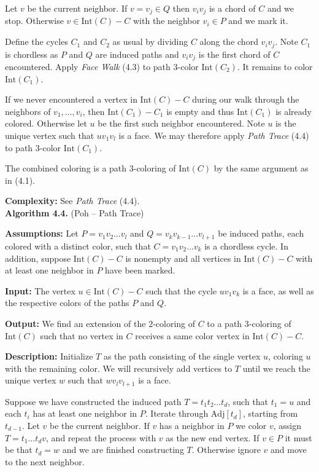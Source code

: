 \documentclass[letterpaper, 12pt]{article}
\theoremstyle{definition}
\theoremstyle{definition}
\theoremstyle{thm}
\theoremstyle{definition}
\begin{document}
Let $v$ be the current neighbor. If $v=v_j\in Q$ then $v_iv_j$ is a chord of $C$
and we stop. Otherwise $v\in \text{Int}(C)-C$ with the neighbor $v_i\in P$ and we
mark it.

Define the cycles $C_1$ and $C_2$ as usual by dividing $C$ along the chord
$v_iv_j$. Note $C_1$ is chordless as $P$ and $Q$ are induced paths
and $v_iv_j$ is the first chord of $C$ encountered. Apply \textit{Face Walk}
(4.3) to path $3$-color $\text{Int}(C_2)$. It remains to color
$\text{Int}(C_1)$.

If we never encountered a vertex in $\text{Int}(C)-C$ during our walk through
the neighbors of $v_1,\ldots,v_i$, then $\text{Int}(C_1)-C_1$ is empty and thus
$\text{Int}(C_1)$ is already colored. Otherwise let $u$ be the first such
neighbor encountered. Note $u$ is the unique vertex
such that $uv_1v_l$ is a face. We may therefore apply \textit{Path Trace} (4.4)
to path $3$-color $\text{Int}(C_1)$.

The combined coloring is a path $3$-coloring of $\text{Int}(C)$ by the
same argument as in (4.1).

\noindent\textbf{Complexity:} See \textit{Path Trace} (4.4).\\

\noindent\textbf{Algorithm 4.4.} (Poh -- Path Trace)

\noindent\textbf{Assumptions:} Let $P=v_1v_2\ldots v_l$ and
$Q=v_kv_{k-1}\ldots v_{l+1}$ be induced paths, each colored with a distinct
color, such that $C=v_1v_2\ldots v_k$ is a chordless cycle. In
addition, suppose $\text{Int}(C)-C$ is nonempty and all vertices in
$\text{Int}(C)- C$ with at least one neighbor in $P$ have been marked.

\noindent\textbf{Input:} The vertex $u\in \text{Int}(C)-C$ such that the cycle
$uv_1v_k$ is a face, as well as the respective colors of the paths $P$ and $Q$.

\noindent\textbf{Output:} We find an extension of the $2$-coloring of $C$ to a
path $3$-coloring of $\text{Int}(C)$ such that no vertex in $C$ receives a same
color vertex in $\text{Int}(C)-C$.

\noindent\textbf{Description:} Initialize $T$ as the path consisting of the
single vertex $u$, coloring $u$ with the remaining color. We will recursively
add vertices to $T$ until we reach the unique vertex $w$ such that $wv_lv_{l+1}$
is a face.

Suppose we have constructed the induced path $T=t_1t_2\ldots t_d$, such that
$t_1=u$ and each $t_i$ has at least one neighbor in $P$.
Iterate through $\text{Adj}[t_d]$,
starting from $t_{d-1}$. Let $v$ be the current neighbor. If $v$ has a neighbor
in $P$ we color $v$, assign $T=t_1\ldots t_dv$, and repeat the process with $v$ as
the new end vertex. If $v\in P$ it must be that $t_d=w$ and we are finished
constructing $T$. Otherwise ignore $v$ and move to the next neighbor.
\end{document}
